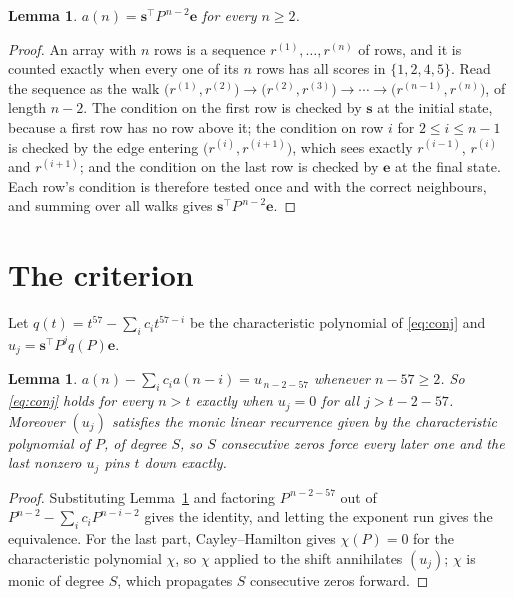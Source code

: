 \documentclass[11pt,a4paper]{article}
\theoremstyle{plain}
\newtheorem{lemma}[theorem]{Lemma}
\theoremstyle{definition}
\begin{document}
\begin{lemma}\label{lem:walk}
$a(n)=\mathbf{s}^{\!\top}P^{\,n-2}\mathbf{e}$ for every $n\ge2$.
\end{lemma}

\begin{proof}
An array with $n$ rows is a sequence $r^{(1)},\dots,r^{(n)}$ of rows, and it is counted
exactly when every one of its $n$ rows has all scores in $\{1,2,4,5\}$. Read the sequence as the
walk $\bigl(r^{(1)},r^{(2)}\bigr)\to\bigl(r^{(2)},r^{(3)}\bigr)\to\cdots\to
\bigl(r^{(n-1)},r^{(n)}\bigr)$, of length $n-2$. The condition on the first row is
checked by $\mathbf{s}$ at the initial state, because a first row has no row above it; the
condition on row $i$ for $2\le i\le n-1$ is checked by the edge entering
$\bigl(r^{(i)},r^{(i+1)}\bigr)$, which sees exactly $r^{(i-1)}$, $r^{(i)}$ and
$r^{(i+1)}$; and the condition on the last row is checked by $\mathbf{e}$ at the final
state. Each row's condition is therefore tested once and with the correct neighbours, and
summing over all walks gives $\mathbf{s}^{\!\top}P^{\,n-2}\mathbf{e}$.
\end{proof}

\section{The criterion}

Let $q(t)=t^{57}-\sum_i c_i t^{57-i}$ be the characteristic polynomial of
\eqref{eq:conj} and $u_j=\mathbf{s}^{\!\top}P^{j}q(P)\mathbf{e}$.

\begin{lemma}\label{lem:crit}
$a(n)-\sum_i c_i a(n-i)=u_{\,n-2-57}$ whenever $n-57\ge2$. So \eqref{eq:conj}
holds for every $n>t$ exactly when $u_j=0$ for all $j>t-2-57$. Moreover $(u_j)$
satisfies the monic linear recurrence given by the characteristic polynomial of $P$, of
degree $S$, so $S$ consecutive zeros force every later one and the last nonzero $u_j$ pins
$t$ down exactly.
\end{lemma}

\begin{proof}
Substituting Lemma~\ref{lem:walk} and factoring $P^{\,n-2-57}$ out of
$P^{n-2}-\sum_i c_i P^{n-i-2}$ gives the identity, and letting the exponent run gives the
equivalence. For the last part, Cayley--Hamilton gives $\chi(P)=0$ for the characteristic
polynomial $\chi$, so $\chi$ applied to the shift annihilates $(u_j)$; $\chi$ is monic of
degree $S$, which propagates $S$ consecutive zeros forward.
\end{proof}
\end{document}
